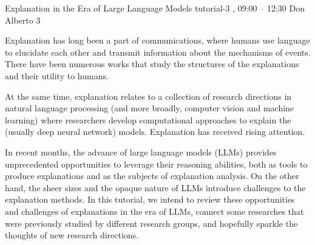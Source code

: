%

\clearpage
\begin{tutorial}
  {Explanation in the Era of Large Language Models}
  {tutorial-3}
  {\daydateyear, 09:00 -- 12:30}
  {Don Alberto 3}

Explanation has long been a part of communications, where humans use language to elucidate each other and transmit information about the mechanisms of events. There have been numerous works that study the structures of the explanations and their utility to humans.

At the same time, explanation relates to a collection of research directions in natural language processing (and more broadly, computer vision and machine learning) where researchers develop computational approaches to explain the (usually deep neural network) models. Explanation has received rising attention.

In recent months, the advance of large language models (LLMs) provides unprecedented opportunities to leverage their reasoning abilities, both as tools to produce explanations and as the subjects of explanation analysis. On the other hand, the sheer sizes and the opaque nature of LLMs introduce challenges to the explanation methods. In this tutorial, we intend to review these opportunities and challenges of explanations in the era of LLMs, connect some researches that were previously studied by different research groups, and hopefully sparkle the thoughts of new research directions.


\end{tutorial}
